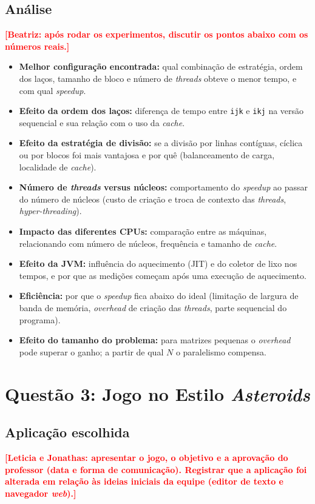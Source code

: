 \documentclass[12pt]{article}
\newcommand{\todo}[1]{\textcolor{red}{\textbf{[#1]}}}
\begin{document}
\subsection{Análise}

\todo{Beatriz: após rodar os experimentos, discutir os pontos abaixo com os números reais.}
\begin{itemize}
  \item \textbf{Melhor configuração encontrada:} qual combinação de estratégia, ordem dos laços, tamanho de bloco e número de \textit{threads} obteve o menor tempo, e com qual \textit{speedup}.
  \item \textbf{Efeito da ordem dos laços:} diferença de tempo entre \texttt{ijk} e \texttt{ikj} na versão sequencial e sua relação com o uso da \textit{cache}.
  \item \textbf{Efeito da estratégia de divisão:} se a divisão por linhas contíguas, cíclica ou por blocos foi mais vantajosa e por quê (balanceamento de carga, localidade de \textit{cache}).
  \item \textbf{Número de \textit{threads} versus núcleos:} comportamento do \textit{speedup} ao passar do número de núcleos (custo de criação e troca de contexto das \textit{threads}, \textit{hyper-threading}).
  \item \textbf{Impacto das diferentes CPUs:} comparação entre as máquinas, relacionando com número de núcleos, frequência e tamanho de \textit{cache}.
  \item \textbf{Efeito da JVM:} influência do aquecimento (JIT) e do coletor de lixo nos tempos, e por que as medições começam após uma execução de aquecimento.
  \item \textbf{Eficiência:} por que o \textit{speedup} fica abaixo do ideal (limitação de largura de banda de memória, \textit{overhead} de criação das \textit{threads}, parte sequencial do programa).
  \item \textbf{Efeito do tamanho do problema:} para matrizes pequenas o \textit{overhead} pode superar o ganho; a partir de qual $N$ o paralelismo compensa.
\end{itemize}

\section{Questão 3: Jogo no Estilo \textit{Asteroids}}
\label{sec:q3}

\subsection{Aplicação escolhida}
\todo{Leticia e Jonathas: apresentar o jogo, o objetivo e a aprovação do professor (data e forma de comunicação). Registrar que a aplicação foi alterada em relação às ideias iniciais da equipe (editor de texto e navegador \textit{web}).}
\end{document}
